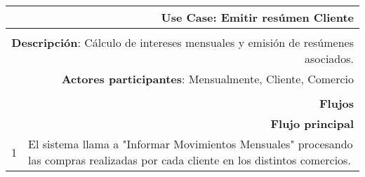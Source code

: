 \begin{tabularx}{\textwidth}{| r | X |}
\hline
\multicolumn{2}{|X|}{
\textbf{Use Case}: Emitir resúmen Cliente} \\

\hline
\multicolumn{2}{|c|}{\cellcolor[gray]{0.6}} \\

\hline
\multicolumn{2}{|X|}{
\textbf{Descripción}: Cálculo de intereses mensuales y emisión de
resúmenes asociados.} \\

\hline
\multicolumn{2}{|X|}{
\textbf{Actores participantes}: Mensualmente, Cliente, Comercio} \\

\hline
\multicolumn{2}{|c|}{\cellcolor[gray]{0.6} } \\

\hline
\multicolumn{2}{|X|}{
\textbf{Flujos}} \\

\hline
\multicolumn{2}{|X|}{
\textbf{Flujo principal}} \\

\hline
1 & El sistema llama a "Informar Movimientos Mensuales" procesando las compras realizadas por cada cliente en los distintos
comercios. \\


\end{tabularx}
